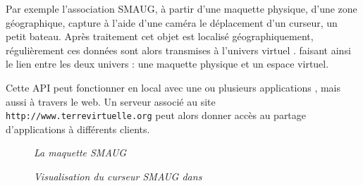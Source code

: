 Par exemple l'association SMAUG, à partir d'une maquette physique, d'une zone géographique, capture à l'aide d'une caméra le déplacement d'un curseur, un petit bateau. Après traitement cet objet est localisé géographiquement, régulièrement ces données sont alors transmises à l'univers virtuel \nav. faisant ainsi le lien entre les deux univers : une maquette physique et un espace virtuel.

Cette API peut fonctionner en local avec une ou plusieurs applications \nav, mais aussi à travers le web. Un serveur associé au site {\tt http://www.terrevirtuelle.org}  peut alors donner accès au partage d'applications \nav à différents clients.
\begin{center}
\begin{figure}[ht]
\caption{\label{smaug0}\textit{La maquette SMAUG}}
\end{figure}
\end{center}
\begin{center}
\begin{figure}[ht]
\caption{\label{smaug}\textit{Visualisation du curseur SMAUG dans \nav}}
\end{figure}
\end{center}
\newpage
